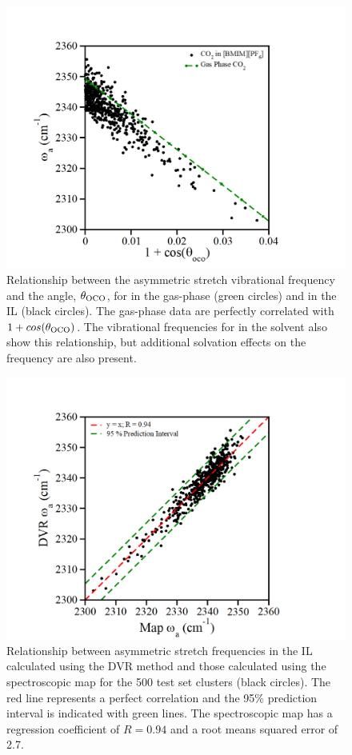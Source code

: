 \documentclass[]{article}
\begin{document}
\begin{figure}[h]
  \centering
  \includegraphics{figure1.png}
  \caption{Relationship between the  asymmetric stretch vibrational frequency and the  angle, \(\theta_{\ce{OCO}}\), for  in the gas-phase (green circles) and in the \ce{[C4C1im][PF6]} IL (black circles). The gas-phase data are perfectly correlated with \(1 + cos(\theta_{\ce{OCO}})\). The vibrational frequencies for  in the \ce{[C4C1im][PF6]} solvent also show this relationship, but additional solvation effects on the frequency are also present.}
  \label{paper_03:fig1}
\end{figure}

\begin{figure}[h]
  \centering
  \includegraphics{figure2.png}
  \caption{Relationship between  asymmetric stretch frequencies in the \ce{[C4C1im][PF6]} IL calculated using the DVR method and those calculated using the spectroscopic map for the 500 test set clusters (black circles). The red line represents a perfect correlation and the 95\% prediction interval is indicated with green lines. The spectroscopic map has a regression coefficient of \(R = 0.94\) and a root means squared error of \SI{2.7}{\wavenumber}.}
  \label{paper_03:fig2}
\end{figure}
\end{document}

